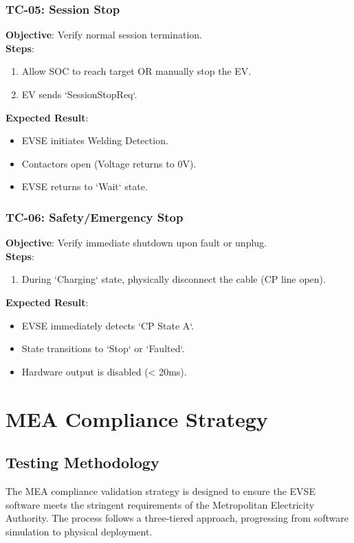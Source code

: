 \documentclass[a4paper,11pt]{report}
\begin{document}
\subsection{TC-05: Session Stop}
\textbf{Objective}: Verify normal session termination. \\
\textbf{Steps}:
\begin{enumerate}
    \item Allow SOC to reach target OR manually stop the EV.
    \item EV sends `SessionStopReq`.
\end{enumerate}
\textbf{Expected Result}:
\begin{itemize}
    \item EVSE initiates Welding Detection.
    \item Contactors open (Voltage returns to 0V).
    \item EVSE returns to `Wait` state.
\end{itemize}

\subsection{TC-06: Safety/Emergency Stop}
\textbf{Objective}: Verify immediate shutdown upon fault or unplug. \\
\textbf{Steps}:
\begin{enumerate}
    \item During `Charging` state, physically disconnect the cable (CP line open).
\end{enumerate}
\textbf{Expected Result}:
\begin{itemize}
    \item EVSE immediately detects `CP State A`.
    \item State transitions to `Stop` or `Faulted`.
    \item Hardware output is disabled (< 20ms).
\end{itemize}
\newpage

\chapter{MEA Compliance Strategy}

\section{Testing Methodology}
The MEA compliance validation strategy is designed to ensure the EVSE software meets the stringent requirements of the Metropolitan Electricity Authority. The process follows a three-tiered approach, progressing from software simulation to physical deployment.
\end{document}

